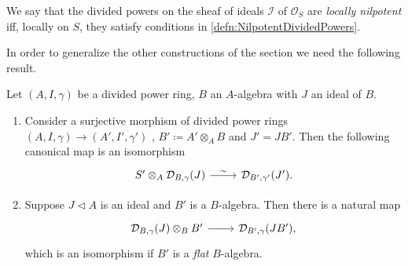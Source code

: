 \begin{defn}
	We say that the divided powers on the sheaf of ideals $\mathcal{I}$
	of $\mathcal{O}_{ S }$ are {\em locally nilpotent} iff,
	locally on $S$, they satisfy conditions in \cref{defn:NilpotentDividedPowers}.
\end{defn}


\noindent
In order to generalize the other constructions of the section
we need the following result.


\begin{prop}\label{prop:PDEnvScheme}
	Let $\left(A, I, \gamma\right)$ be a divided power ring, $B$
	an $A$-algebra with $J$ an ideal of $B$.
\begin{enumerate}
	\item Consider a surjective morphism of divided power rings
		$\left(A, I, \gamma\right) \to  \left(A', I', \gamma'\right)$ ,
		$B' \coloneqq A' \otimes_A B$ and $J' = JB'$.
		Then the following canonical map is an isomorphism
		\begin{equation*}
		\begin{tikzcd}[row sep = 0ex
			,/tikz/column 1/.append style={anchor=base east}
			,/tikz/column 2/.append style={anchor=base west}]
			S' \otimes_A \mathcal{D}_{B,\gamma}(J) \arrow[r, "\sim", rightarrow] &
			\mathcal{D}_{B',\gamma'}(J')
		.\end{tikzcd}
		\end{equation*} 

	\item Suppose $J \triangleleft A$ is an ideal and $B'$ is a $B$-algebra.
		Then there is a natural map
		\begin{equation*}
		\begin{tikzcd}[row sep = 0ex
			,/tikz/column 1/.append style={anchor=base east}
			,/tikz/column 2/.append style={anchor=base west}]
			\mathcal{D}_{B,\gamma}(J) \otimes_B B' \arrow[r, "", rightarrow] &
			\mathcal{D}_{B',\gamma}(JB')
		,\end{tikzcd}
		\end{equation*} 
		which is an isomorphism if $B'$ is a {\em flat} $B$-algebra.
\end{enumerate}
\end{prop}


